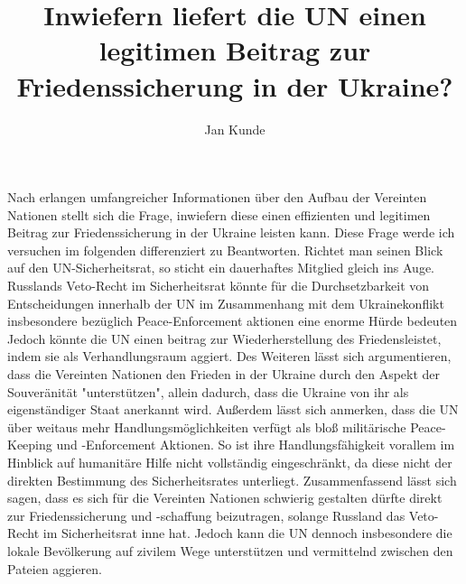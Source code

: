 \documentclass{article}
\author{Jan Kunde}
\date{}
\title{Inwiefern liefert die UN einen legitimen Beitrag zur Friedenssicherung in der Ukraine?}
\begin{document}
\maketitle

\noindent Nach erlangen umfangreicher Informationen über den Aufbau 
der Vereinten Nationen stellt sich die Frage, inwiefern diese einen effizienten und legitimen Beitrag zur Friedenssicherung
in der Ukraine leisten kann. Diese Frage werde ich versuchen im folgenden differenziert zu Beantworten.
\break
\break
Richtet man seinen Blick auf den UN-Sicherheitsrat, so sticht ein dauerhaftes Mitglied gleich ins Auge. Russlands Veto-Recht im Sicherheitsrat könnte für die
Durchsetzbarkeit von Entscheidungen innerhalb der UN im Zusammenhang mit dem Ukrainekonflikt insbesondere bezüglich Peace-Enforcement aktionen eine enorme Hürde bedeuten
Jedoch könnte die UN einen beitrag zur Wiederherstellung des Friedensleistet, indem sie als Verhandlungsraum aggiert.
Des Weiteren lässt sich argumentieren, dass die Vereinten Nationen den Frieden in der Ukraine durch den Aspekt der Souveränität "unterstützen", allein dadurch, dass die Ukraine von ihr
als eigenständiger Staat anerkannt wird.
Außerdem lässt sich anmerken, dass die UN über weitaus mehr Handlungsmöglichkeiten verfügt als bloß militärische Peace-Keeping und -Enforcement Aktionen. So ist ihre Handlungsfähigkeit
vorallem im Hinblick auf humanitäre Hilfe nicht vollständig eingeschränkt, da diese nicht der direkten Bestimmung des Sicherheitsrates unterliegt.
\break
\break
Zusammenfassend lässt sich sagen, dass es sich für die Vereinten Nationen schwierig gestalten dürfte direkt zur Friedenssicherung und -schaffung beizutragen, solange Russland das 
Veto-Recht im Sicherheitsrat inne hat. Jedoch kann die UN dennoch insbesondere die lokale Bevölkerung auf zivilem Wege unterstützen und vermittelnd zwischen den Pateien aggieren. 
\end{document}
